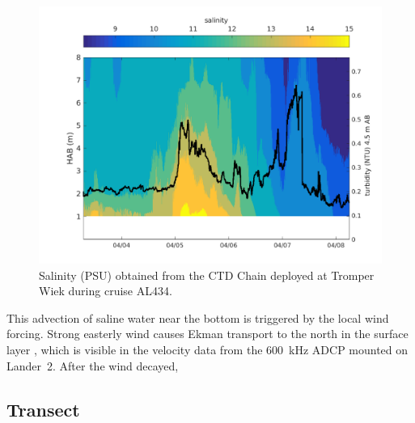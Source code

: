  \begin{figure}[ht]
\includegraphics[width=15cm]{bilder/ctdchaintw.png}
 \caption{Salinity (PSU) obtained from the CTD Chain deployed at Tromper Wiek 
during cruise AL434.}
 \label{ctdchain}
 \end{figure}

 This advection of saline water near the bottom is triggered by the local wind 
forcing. Strong easterly wind causes Ekman transport to the north in the 
surface layer \citep[][]{lass2001}, which is visible in the velocity data from 
the 600~kHz ADCP mounted on Lander~2. After the wind decayed, 

\subsection{Transect}

